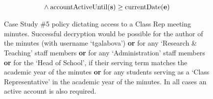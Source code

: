 \begin{figure}[ht]
\begin{align*}
  \\
  &
    \phantom{::}\wedge
    \text{accountActiveUntil(\textbf{s})} \geq \text{currentDate(\textbf{e})}
\end{align*}
  \caption{
    \label{fig:case_study_policy_5}
    Case Study \#5 policy dictating access to a Class Rep meeting minutes.
    Successful decryption would be possible for the author of the minutes (with username `tgalabova') \textbf{or} for any `Research \& Teaching' staff members \textbf{or} for any `Administration' staff members \textbf{or} for the `Head of School', if their serving term matches the academic year of the minutes \textbf{or} for any students serving as a `Class Representative' in the academic year of the minutes. In all cases an active account is also required.
  }
\end{figure}
